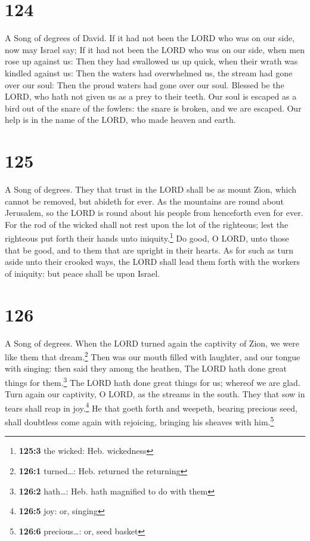\hypertarget{section-125}{%
\section{124}\label{section-125}}

A Song of degrees of David.  If it had not been the LORD
who was on our side, now may Israel say;  If it had not
been the LORD who was on our side, when men rose up against us:
 Then they had swallowed us up quick, when their wrath was
kindled against us:  Then the waters had overwhelmed us,
the stream had gone over our soul:  Then the proud waters
had gone over our soul.  Blessed be the LORD, who hath not
given us as a prey to their teeth.  Our soul is escaped as
a bird out of the snare of the fowlers: the snare is broken, and we are
escaped.  Our help is in the name of the LORD, who made
heaven and earth.

\hypertarget{section-126}{%
\section{125}\label{section-126}}

A Song of degrees.  They that trust in the LORD shall be
as mount Zion, which cannot be removed, but abideth for ever.
 As the mountains are round about Jerusalem, so the LORD
is round about his people from henceforth even for ever. 
For the rod of the wicked shall not rest upon the lot of the righteous;
lest the righteous put forth their hands unto iniquity.\footnote{\textbf{125:3}
  the wicked: Heb. wickedness}  Do good, O LORD, unto
those that be good, and to them that are upright in their hearts.
 As for such as turn aside unto their crooked ways, the
LORD shall lead them forth with the workers of iniquity: but peace shall
be upon Israel.

\hypertarget{section-127}{%
\section{126}\label{section-127}}

A Song of degrees.  When the LORD turned again the
captivity of Zion, we were like them that dream.\footnote{\textbf{126:1}
  turned\ldots: Heb. returned the returning}  Then was our
mouth filled with laughter, and our tongue with singing: then said they
among the heathen, The LORD hath done great things for them.\footnote{\textbf{126:2}
  hath\ldots: Heb. hath magnified to do with them}  The
LORD hath done great things for us; whereof we are glad. 
Turn again our captivity, O LORD, as the streams in the south.
 They that sow in tears shall reap in joy.\footnote{\textbf{126:5}
  joy: or, singing}  He that goeth forth and weepeth,
bearing precious seed, shall doubtless come again with rejoicing,
bringing his sheaves with him.\footnote{\textbf{126:6} precious\ldots:
  or, seed basket}

